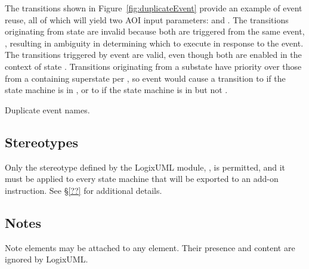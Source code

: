 The transitions shown in Figure~\ref{fig:duplicateEvent} provide an example
of event reuse, all of which will yield two AOI input parameters:
 and .
The transitions originating from state  are invalid because
both are triggered from the same event, ,
resulting in ambiguity in determining which to execute in response to the event.
The transitions triggered by event  are valid, even though both
are enabled in the context of state .
Transitions originating from a substate have priority over those
from a containing superstate per \textcite[\S14.2.3.9.4]{OMGUML}, so
event  would cause a transition to  if the
state machine is in , or to  if the state
machine is in  but not .

               {Duplicate event names.}


\subsection{Stereotypes}

Only the stereotype defined by the LogixUML module,
, is permitted, and it must be applied to
every state machine that will be exported to an add-on instruction.
See \S\ref{??} for additional details.


\subsection{Notes}

Note elements may be attached to any element. Their presence and content
are ignored by LogixUML.
